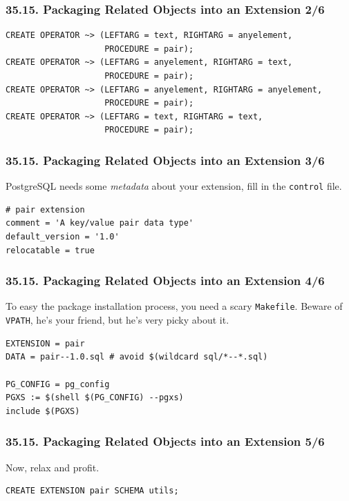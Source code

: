\documentclass[english]{beamer}
\begin{document}
\begin{frame}[fragile]
  \frametitle{35.15. Packaging Related Objects into an Extension 2/6}

\begin{example}
\begin{verbatim}
CREATE OPERATOR ~> (LEFTARG = text, RIGHTARG = anyelement,
                    PROCEDURE = pair);
CREATE OPERATOR ~> (LEFTARG = anyelement, RIGHTARG = text,
                    PROCEDURE = pair);
CREATE OPERATOR ~> (LEFTARG = anyelement, RIGHTARG = anyelement,
                    PROCEDURE = pair);
CREATE OPERATOR ~> (LEFTARG = text, RIGHTARG = text,
                    PROCEDURE = pair);
\end{verbatim}
\end{example}
\end{frame}

\begin{frame}[fragile]
  \frametitle{35.15. Packaging Related Objects into an Extension 3/6}

  PostgreSQL needs some \textit{metadata} about your extension, fill in the
  \texttt{control} file.

\begin{example}
\begin{verbatim}
# pair extension
comment = 'A key/value pair data type'
default_version = '1.0'
relocatable = true
\end{verbatim}
\end{example}
\end{frame}

\begin{frame}[fragile]
  \frametitle{35.15. Packaging Related Objects into an Extension 4/6}

  To easy the package installation process, you need a scary
  \texttt{Makefile}. Beware of \texttt{VPATH}, he's your friend, but he's
  very picky about it.

\begin{example}[Makefile]
\begin{verbatim}
EXTENSION = pair
DATA = pair--1.0.sql # avoid $(wildcard sql/*--*.sql)

PG_CONFIG = pg_config
PGXS := $(shell $(PG_CONFIG) --pgxs)
include $(PGXS)
\end{verbatim}
\end{example}
\end{frame}

\begin{frame}[fragile]
  \frametitle{35.15. Packaging Related Objects into an Extension 5/6}

  Now, relax and profit.

\begin{example}[psql]
\begin{verbatim}
CREATE EXTENSION pair SCHEMA utils;
\end{verbatim}
\end{example}
\end{frame}
\end{document}
